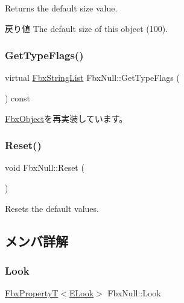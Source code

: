 Returns the default size value. \begin{DoxyReturn}{戻り値}
The default size of this object (100). 
\end{DoxyReturn}
\mbox{\label{class_fbx_null_a48d35f4f24364e439f0d8a8e07c6d98f}} 
\subsubsection{\texorpdfstring{Get\+Type\+Flags()}{GetTypeFlags()}}
{\footnotesize\ttfamily virtual \hyperlink{class_fbx_string_list}{Fbx\+String\+List} Fbx\+Null\+::\+Get\+Type\+Flags (\begin{DoxyParamCaption}{ }\end{DoxyParamCaption}) const\hspace{0.3cm}{\ttfamily [virtual]}}



\hyperlink{class_fbx_object_a6d30a5d00400039a248977cf9f9255b2}{Fbx\+Object}を再実装しています。

\mbox{\label{class_fbx_null_add3bbcdc43864c3e8341c31e1cc68ec9}} 
\subsubsection{\texorpdfstring{Reset()}{Reset()}}
{\footnotesize\ttfamily void Fbx\+Null\+::\+Reset (\begin{DoxyParamCaption}{ }\end{DoxyParamCaption})}



Resets the default values. 



\subsection{メンバ詳解}
\mbox{\label{class_fbx_null_a19a7ff9c2111b18702002f4728013278}} 
\subsubsection{\texorpdfstring{Look}{Look}}
{\footnotesize\ttfamily \hyperlink{class_fbx_property_t}{Fbx\+PropertyT}$<$\hyperlink{class_fbx_null_aa68cd0be1fca86a79ab603ee99505d78}{E\+Look}$>$ Fbx\+Null\+::\+Look}

